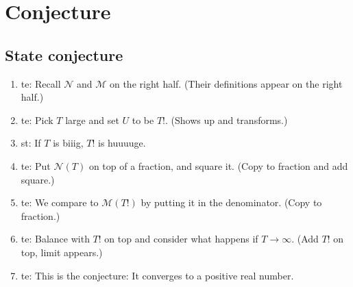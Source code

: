 \documentclass[a4paper]{article}
\begin{document}
\section{Conjecture}
\subsection{State conjecture}
\begin{enumerate}
  \item te: Recall $\mathcal{N}$ and $\mathcal{M}$ on the right half. (Their definitions appear on the right half.)
  \item te: Pick $T$ large and set $U$ to be $T!$. (Shows up and transforms.)
  \item st: If $T$ is biiig, $T!$ is huuuuge.
  \item te: Put $\mathcal{N}(T)$ on top of a fraction, and square it. (Copy to fraction and add square.)
  \item te: We compare to $\mathcal{M}(T!)$ by putting it in the denominator. (Copy to fraction.)
  \item te: Balance with $T!$ on top and consider what happens if $T\to \infty$. (Add $T!$ on top, limit appears.)
  \item te: This is the conjecture: It converges to a positive real number.
\end{enumerate}
\end{document}
